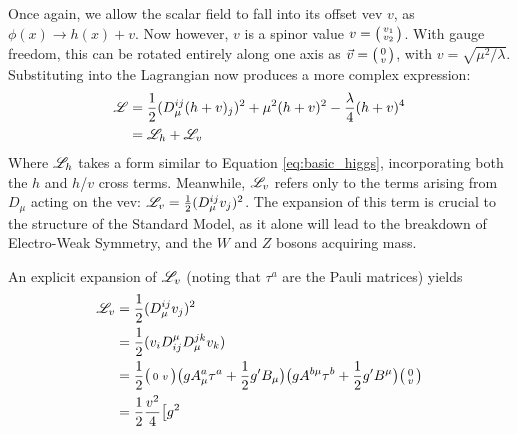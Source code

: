         Once again, we allow the scalar field to fall into its offset vev $v$, as $\phi(x) \rightarrow h(x) + v$.
        Now however, $v$ is a spinor value $v = \big(\begin{smallmatrix} v_1 \\ v_2 \end{smallmatrix}\big)$.
        With gauge freedom, this can be rotated entirely along one axis as $\vec{v} = \big(\begin{smallmatrix} 0 \\ v \end{smallmatrix}\big)$,
            with $v = \sqrt{\mu^2/\lambda}$.
        Substituting into the Lagrangian now produces a more complex expression:
        \begin{equation} \begin{split}
            \mathscr{L} & = \frac{1}{2} (D_{\mu}^{ij} (h+v)_j)^2
                + \mu^2 (h+v)^2
                - \frac{\lambda}{4} (h+v)^4 \\
             & = \mathscr{L}_h + \mathscr{L}_v
        \end{split} \end{equation}
        Where $\mathscr{L}_h$ takes a form similar to Equation \ref{eq:basic_higgs}, incorporating both the $h$ and $h$/$v$ cross terms.
        Meanwhile, $\mathscr{L}_v$ refers only to the terms arising from $D_{\mu}$ acting on the vev:
        $ \mathscr{L}_v = \frac{1}{2} (D_{\mu}^{ij} v_j)^2 $.
        The expansion of this term is crucial to the structure of the Standard Model,
            as it alone will lead to the breakdown of Electro-Weak Symmetry,
            and the $W$ and $Z$ bosons acquiring mass.

        An explicit expansion of $\mathscr{L}_v$ (noting that $\tau^a$ are the Pauli matrices) yields 
        \begin{equation} \begin{split}
            \mathscr{L}_v & = \frac{1}{2} (D_{\mu}^{ij} v_j)^2 \\
            & = \frac{1}{2} (v_i D^{\mu}_{ij} D^{jk}_{\mu} v_k) \\
            & = \frac{1}{2} \big(\begin{smallmatrix} 0 & v \end{smallmatrix}\big) \big( g A^a_{\mu} \tau^a + \frac{1}{2} g' B_{\mu} \big)
            \big( g A^{b\mu} \tau^b + \frac{1}{2} g' B^{\mu} \big) \big(\begin{smallmatrix} 0 \\ v \end{smallmatrix}\big) \\
            & = \frac{1}{2} \frac{v^2}{4} \big[ g^2 
        \end{split} \end{equation}






